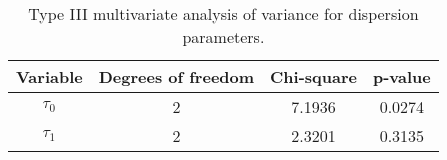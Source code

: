 \documentclass{article}
\begin{document}

\begin{table}[H]
\centering
\begin{tabular}{cccc}
\hline
Variable               & Degrees of freedom & Chi-square & p-value        \\ \hline
$\tau_0$ & 2                  & 7.1936       & 0.0274  \\
$\tau_1$ & 2                  & 2.3201       & 0.3135         \\ \hline
\end{tabular}
\caption{Type III multivariate analysis of variance for dispersion parameters.}
\label{tab8}
\end{table}

\end{document}

